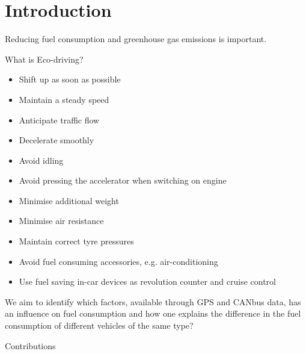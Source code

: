 \section{Introduction}

Reducing fuel consumption and greenhouse gas emissions is important.

What is Eco-driving? \cite{EcodrivingAdvice}
\begin{itemize}
\item Shift up as soon as possible
\item Maintain a steady speed
\item Anticipate traffic flow
\item Decelerate smoothly
\item Avoid idling
\item Avoid pressing the accelerator when switching on engine
\item Minimise additional weight
\item Minimise air resistance
\item Maintain correct tyre pressures
\item Avoid fuel consuming accessories, e.g. air-conditioning
\item Use fuel saving in-car devices as revolution counter and cruise control
\end{itemize}



We aim to identify which factors, available through GPS and CANbus data, has an influence on
fuel consumption and how one explains the difference in the fuel consumption of different
vehicles of the same type?

Contributions